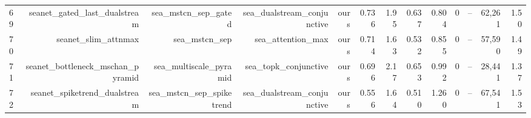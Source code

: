 \begin{table}[t]
\begin{tabular}{lrrrrrrrrrrrr}
69 & seanet\_gated\_last\_dualstream & sea\_mstcn\_sep\_gated & sea\_dualstream\_conjunctive & ours & 0.736 & 1.95 & 0.637 & 0.804 & 0 & -- & 62,261 & 1.50 \\
70 & seanet\_slim\_attnmax & sea\_mstcn\_sep & sea\_attention\_max & ours & 0.714 & 1.63 & 0.532 & 0.855 & 0 & -- & 57,590 & 1.49 \\
71 & seanet\_bottleneck\_mschan\_pyramid & sea\_multiscale\_pyramid & sea\_topk\_conjunctive & ours & 0.696 & 2.17 & 0.653 & 0.992 & 0 & -- & 28,441 & 1.37 \\
72 & seanet\_spiketrend\_dualstream & sea\_mstcn\_sep\_spiketrend & sea\_dualstream\_conjunctive & ours & 0.556 & 1.64 & 0.510 & 1.260 & 0 & -- & 67,541 & 1.53 \\
\bottomrule
\end{tabular}
\end{table}
